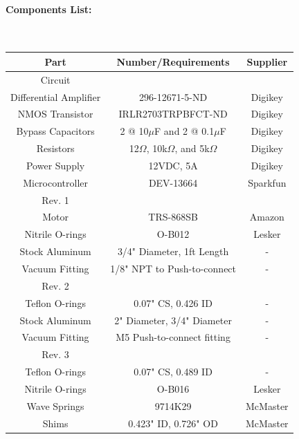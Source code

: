 \documentclass[12pt]{report}
\begin{document}
\paragraph{Components List:} \hspace{1cm} \\
\begin{tabular}{c|c|c}
Part & Number/Requirements & Supplier\\
\hline
Circuit &&\\
Differential Amplifier & 296-12671-5-ND & Digikey\\
NMOS Transistor & IRLR2703TRPBFCT-ND & Digikey \\
Bypass Capacitors & 2 @ 10$\mu$F and 2 @ 0.1$\mu$F & Digikey\\
Resistors & 12$\Omega$, 10k$\Omega$, and 5k$\Omega$ & Digikey\\
Power Supply & 12VDC, 5A & Digikey \\
Microcontroller & DEV-13664 & Sparkfun \\
\hline
Rev. 1 & & \\
Motor & TRS-868SB & Amazon\\
Nitrile O-rings & O-B012 & Lesker \\
Stock Aluminum & 3/4" Diameter, 1ft Length & - \\
Vacuum Fitting & 1/8" NPT to Push-to-connect & - \\
\hline
Rev. 2 & & \\
Teflon O-rings & 0.07" CS, 0.426 ID & -\\
Stock Aluminum & 2" Diameter, 3/4" Diameter & -\\
Vacuum Fitting & M5 Push-to-connect fitting & -\\
\hline
Rev. 3 & & \\
Teflon O-rings & 0.07" CS, 0.489 ID & -\\
Nitrile O-rings & O-B016 & Lesker\\
Wave Springs & 9714K29 & McMaster\\
Shims & 0.423" ID, 0.726" OD & McMaster
\end{tabular}
\end{document}

